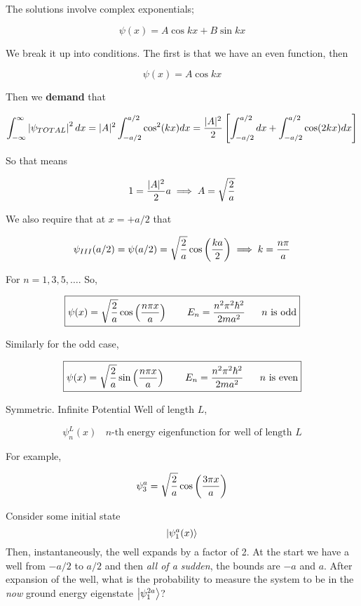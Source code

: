 \documentclass[english, 11pt]{article}
\begin{document}
        The solutions involve complex exponentials;

        \[ \psi(x) = A\cos kx + B\sin kx \]

        We break it up into conditions. The first is that we have an even function, then

        \[ \psi(x) = A\cos kx \]

        Then we \textbf{demand} that

        \[ \int_{-\infty}^{\infty} \left|\psi_{TOTAL}\right|^2 dx = |A|^2 \int_{-a/2}^{a/2}\cos^2 (kx) dx = \frac{|A|^2}{2} \left[ \int_{-a/2}^{a/2} dx + \int_{-a/2}^{a/2}\cos (2kx) dx \right] \]

        So that means

        \[ 1 = \frac{|A|^2}{2} a \implies A = \sqrt{\frac{2}{a}} \]

        We also require that at $x = +a/2$ that

        \[ \psi_{III}(a/2) = \psi(a/2) = \sqrt{\frac{2}{a}}\cos \left( \frac{ka}{2} \right) \implies k = \frac{n\pi}{a} \]

        For $n = 1, 3,5,\ldots$. So,

        \[ \boxed{\psi(x) = \sqrt{\frac{2}{a}}\cos \left( \frac{n\pi x}{a} \right)  \ \ \ \ \ \ E_n = \frac{n^2\pi^2\hbar^2}{2ma^2} \ \ \ \ \ n \mbox{ is odd}} \]

        Similarly for the odd case,

        \[ \boxed{\psi(x) = \sqrt{\frac{2}{a}}\sin \left( \frac{n\pi x}{a} \right)  \ \ \ \ \ \ E_n = \frac{n^2\pi^2\hbar^2}{2ma^2} \ \ \ \ \ n \mbox{ is even}} \]

        Symmetric. Infinite Potential Well of length $L$,

        \[ \psi_n^L(x) \ \ \ \ \mbox{$n$-th energy eigenfunction for well of length $L$} \]

        For example,

        \[ \psi_3^a = \sqrt{\frac{2}{a}} \cos \left( \frac{3\pi x}{a} \right)\]

        \begin{exmp}
          Consider some initial state
          \[ \left|\psi_1^a(x)\right\rangle \]
          Then, instantaneously, the well expands by a factor of 2. At the start we have a well from $-a/2$ to $a/2$ and then \textit{all of a sudden}, the bounds are $-a$ and $a$. After expansion of the well, what is the probability to measure the system to be in the \textit{now} ground energy eigenstate $\left|\psi_1^{2a}\right\rangle$?
        \end{exmp}
\end{document}
